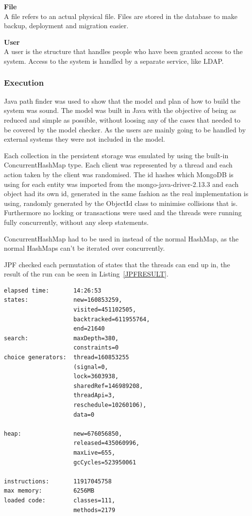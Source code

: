 \documentclass[a4paper,12pt]{article}
\begin{document}
\par \textbf{File} \\
A file refers to an actual physical file. Files are stored in the database to make backup,
deployment and migration easier.\\

\par \textbf{User} \\
A user is the structure that handles people who have been granted access to the system. Access to
the system is handled by a separate service, like LDAP.\\

\subsubsection{Execution}
Java path finder was used to show that the model and plan of how to build the system was sound. The
model was built in Java with the objective of being as reduced and simple as possible, without
loosing any of the cases that needed to be covered by the model checker. As the users are mainly
going to be handled by external systems they were not included in the model.

Each collection in the persistent storage was emulated by using the built-in ConcurrentHashMap type.
Each client was represented by a thread and each action taken by the client was randomised. The id
hashes which MongoDB is using for each entity was imported from the mongo-java-driver-2.13.3 and
each object had its own id, generated in the same fashion as the real implementation is using,
randomly generated by the ObjectId class to minimise collisions that is.  Furthermore no locking or
transactions were used and the threads were running fully concurrently, without any sleep
statements. 

ConcurrentHashMap had to be used in instead of the normal HashMap, as the normal HashMaps can't be
iterated over concurrently.

JPF checked each permutation of states that the threads can end up in, the result of the run can be
seen in Listing~\ref{JPFRESULT}.

\begin{lstlisting}[label=JPFRESULT,caption=Results of JPF run]
elapsed time:       14:26:53
states:             new=160853259,
                    visited=451102505,
                    backtracked=611955764,
                    end=21640
search:             maxDepth=380,
                    constraints=0
choice generators:  thread=160853255 
                    (signal=0,
                    lock=3603938,
                    sharedRef=146989208,
                    threadApi=3,
                    reschedule=10260106), 
                    data=0

heap:               new=676056850,
                    released=435060996,
                    maxLive=655,
                    gcCycles=523950061

instructions:       11917045758
max memory:         6256MB
loaded code:        classes=111,
                    methods=2179
\end{lstlisting}
\end{document}
